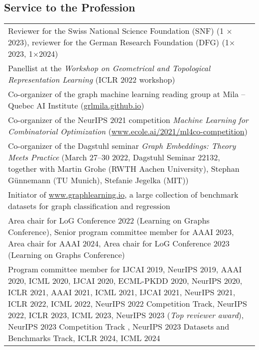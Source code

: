 \documentclass[11pt, a4paper, DIV=14, headings=small]{scrartcl}
\begin{document}
	\subsection*{Service to the Profession}
	\begin{longtabu}{p{14.5cm}}
	Reviewer for the Swiss National Science Foundation (SNF) (1 $\times$ 2023), reviewer for the German Research Foundation (DFG) (1$\times$2023, 1$\times$2024)	\\
		
	
		Panellist at the \emph{Workshop on Geometrical and Topological Representation Learning} (ICLR 2022 workshop) \\
		Co-organizer of the graph machine learning reading group at Mila -- Quebec AI Institute (\url{grlmila.github.io}) \\
		
		Co-organizer of the NeurIPS 2021 competition \emph{Machine Learning for Combinatorial Optimization} (\url{www.ecole.ai/2021/ml4co-competition}) \\
		
		Co-organizer of the Dagstuhl seminar \emph{Graph Embeddings: Theory Meets Practice} (March 27–30 2022, Dagstuhl Seminar 22132, together with Martin Grohe (RWTH Aachen University), Stephan Günnemann (TU Munich), Stefanie Jegelka (MIT)) \\
		
		Initiator of \url{www.graphlearning.io}, a large collection of benchmark datasets for graph classification and regression \\
		
		Area chair for LoG Conference 2022 (Learning on Graphs Conference), Senior program committee member for AAAI 2023, Area chair for AAAI 2024, Area chair for LoG Conference 2023 (Learning on Graphs Conference) \\
		
		Program committee member for IJCAI 2019, NeurIPS  2019, AAAI 2020, ICML 2020, IJCAI 2020, ECML-PKDD 2020, NeurIPS 2020, ICLR 2021, AAAI 2021, ICML 2021, IJCAI 2021, NeurIPS 2021, ICLR 2022, ICML 2022, NeurIPS 2022 Competition Track, NeurIPS 2022, ICLR 2023, ICML 2023, NeurIPS 2023 (\emph{Top reviewer award}), NeurIPS 2023 Competition Track , NeurIPS 2023 Datasets and Benchmarks Track, ICLR 2024, ICML 2024 \\
		

\end{longtabu}
\end{document}
